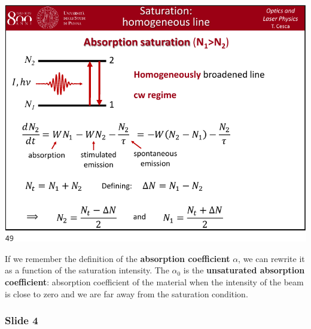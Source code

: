 \documentclass[../main/main.tex]{subfiles}
\begin{document}
\begin{minipage}[]{0.5\linewidth}
\centering
\includegraphics[page=3,width=1\textwidth]{../lessons/pdf_file/10_lecture.pdf}
\end{minipage}
\hspace{0.3cm}\vspace{0.3cm}
\begin{minipage}[c]{0.47\linewidth}

If we remember the definition of the \textbf{absorption coefficient} \( \alpha  \), we can rewrite it as a function of the saturation intensity. The \( \alpha _0 \) is the \textbf{unsaturated absorption coefficient}: absorption coefficient of the material when the intensity of the beam is close to zero and we are far away from the saturation condition.

\end{minipage}

\newpage

\subsubsection*{Slide 4}
\end{document}
